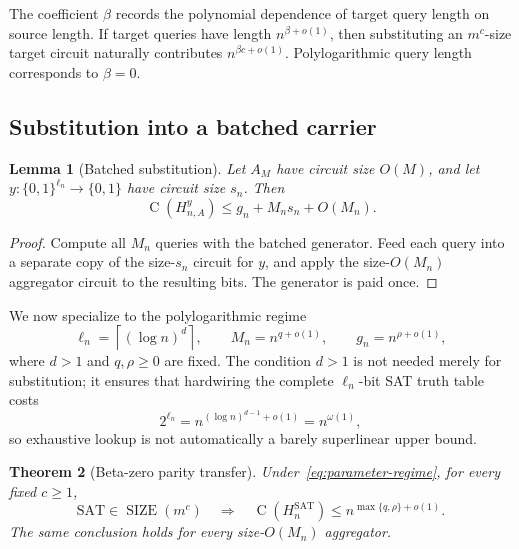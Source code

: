\documentclass[11pt]{article}
\newtheorem{theorem}{Theorem}[section]
\newtheorem{lemma}[theorem]{Lemma}
\theoremstyle{definition}
\newcommand{\bits}{\{0,1\}}
\newcommand{\SIZE}{\operatorname{SIZE}}
\newcommand{\Ckt}{\operatorname{C}}
\newcommand{\SAT}{\mathrm{SAT}}
\begin{document}
The coefficient $\beta$ records the polynomial dependence of target query length on source length. If target queries have length $n^{\beta+o(1)}$, then substituting an $m^c$-size target circuit naturally contributes $n^{\beta c+o(1)}$. Polylogarithmic query length corresponds to $\beta=0$.

\subsection{Substitution into a batched carrier}

\begin{lemma}[Batched substitution]\label{lem:substitution}
Let $A_M$ have circuit size $O(M)$, and let $y:\bits^{\ell_n}\to\bits$ have circuit size $s_n$. Then
\begin{equation}\label{eq:batched-substitution}
  \Ckt(H_{n,A}^y)
  \le g_n+M_n s_n+O(M_n).
\end{equation}
\end{lemma}

\begin{proof}
Compute all $M_n$ queries with the batched generator. Feed each query into a separate copy of the size-$s_n$ circuit for $y$, and apply the size-$O(M_n)$ aggregator circuit to the resulting bits. The generator is paid once.
\end{proof}

We now specialize to the polylogarithmic regime
\begin{equation}\label{eq:parameter-regime}
  \ell_n=\left\lceil(\log n)^d\right\rceil,
  \qquad
  M_n=n^{q+o(1)},
  \qquad
  g_n=n^{\rho+o(1)},
\end{equation}
where $d>1$ and $q,\rho\ge 0$ are fixed. The condition $d>1$ is not needed merely for substitution; it ensures that hardwiring the complete $\ell_n$-bit SAT truth table costs
\[
  2^{\ell_n}=n^{(\log n)^{d-1}+o(1)}=n^{\omega(1)},
\]
so exhaustive lookup is not automatically a barely superlinear upper bound.

\begin{theorem}[Beta-zero parity transfer]\label{thm:beta-zero-transfer}
Under~\eqref{eq:parameter-regime}, for every fixed $c\ge 1$,
\begin{equation}\label{eq:beta-zero-bound}
  \SAT\in\SIZE(m^c)
  \quad\Longrightarrow\quad
  \Ckt(H_n^{\SAT})
  \le n^{\max\{q,\rho\}+o(1)}.
\end{equation}
The same conclusion holds for every size-$O(M_n)$ aggregator.
\end{theorem}
\end{document}
